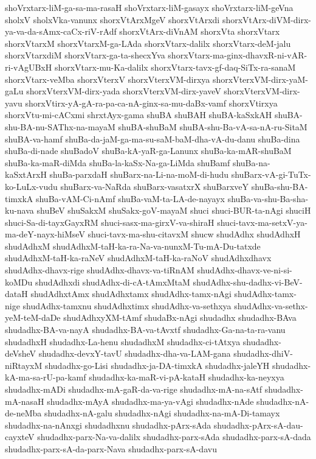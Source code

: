 {shoVrxtarx-liM-ga-sa-ma-rasaH
shoVrxtarx-liM-gasayx
shoVrxtarx-liM-geVna
sholxV
sholxVka-vanunx
shorxVtArxMgeV
shorxVtArxdi
shorxVtArx-diVM-dirx-ya-va-da-sAmx-caCx-riV-rAdf
shorxVtArx-diVnAM
shorxVta
shorxVtarx
shorxVtarxM
shorxVtarxM-ga-LAda
shorxVtarx-dalilx
shorxVtarx-deM-jalu
shorxVtarxdiM
shorxVtarx-ga-ta-shecxYva
shorxVtarx-ma-ginx-dhavxR-ni-vAR-ri-vAgUBxH
shorxVtarx-mu-Ka-dalilx
shorxVtarx-tavx-gf-daq-SiTx-ra-sanaM
shorxVtarx-veMba
shorxVterxV
shorxVterxVM-dirxya
shorxVterxVM-dirx-yaM-gaLu
shorxVterxVM-dirx-yada
shorxVterxVM-dirx-yaveV
shorxVterxVM-dirx-yavu
shorxVtirx-yA-gA-ra-pa-ca-nA-ginx-sa-mu-daBx-vamf
shorxVtirxya
shorxVtu-mi-cACxmi
shrxtAyx-gama
shuBA
shuBAH
shuBA-kaSxkAH
shuBA-shu-BA-nu-SAThx-na-mayaM
shuBA-shuBaM
shuBA-shu-Ba-vA-sa-nA-ru-SitaM
shuBA-va-hamf
shuBa-da-jaM-ga-ma-su-saM-baM-dha-vA-du-danu
shuBa-dina
shuBa-di-nade
shuBadoV
shuBa-kA-yaR-ga-Lanunx
shuBa-ka-mAR-shuBaM
shuBa-ka-maR-diMda
shuBa-la-kaSx-Na-ga-LiMda
shuBamf
shuBa-na-kaSxtArxH
shuBa-parxdaH
shuBarx-na-Li-na-moM-di-hudu
shuBarx-vA-gi-TuTx-ko-LuLx-vudu
shuBarx-va-NaRda
shuBarx-vasatxrX
shuBarxveY
shuBa-shu-BA-timxkA
shuBa-vAM-Ci-nAmf
shuBa-vaM-ta-LA-de-nayayx
shuBa-va-shu-Ba-sha-ku-nava
shuBeV
shuSakxM
shuSakx-goV-mayaM
shuci
shuci-BUR-ta-nAgi
shuciH
shuci-Sa-di-tayxGayxRM
shuci-sasx-ma-girxV-va-shiraH
shuci-tavx-ma-setxV-ya-ma-deY-nayx-hiMseV
shuci-tavx-ma-shu-citavxM
shucw
shudAdhx
shudAdhxH
shudAdhxM
shudAdhxM-taH-ka-ra-Na-va-nunxM-Tu-mA-Du-tatxde
shudAdhxM-taH-ka-raNeV
shudAdhxM-taH-ka-raNoV
shudAdhxdhavx
shudAdhx-dhavx-rige
shudAdhx-dhavx-va-tiRnAM
shudAdhx-dhavx-ve-ni-si-koMDu
shudAdhxdi
shudAdhx-di-cA-tAmxMtaM
shudAdhx-shu-dadhx-vi-BeV-dataH
shudAdhxtAmx
shudAdhxtamx
shudAdhx-tamx-nAgi
shudAdhx-tamx-nige
shudAdhx-tamxnu
shudAdhxtimx
shudAdhx-va-sethxya
shudAdhx-va-sethx-yeM-teM-daDe
shudAdhxyXM-tAmf
shudaBx-nAgi
shudadhx
shudadhx-BAva
shudadhx-BA-va-nayA
shudadhx-BA-va-tAvxtf
shudadhx-Ga-na-ta-ra-vanu
shudadhxH
shudadhx-La-henu
shudadhxM
shudadhx-ci-tAtxya
shudadhx-deVsheV
shudadhx-devxY-tavU
shudadhx-dha-va-LAM-gana
shudadhx-dhiV-niRtayxM
shudadhx-go-Lisi
shudadhx-ja-DA-timxkA
shudadhx-jaleYH
shudadhx-kA-ma-sa-rU-pa-kamf
shudadhx-ka-maR-vi-pA-kataH
shudadhx-ka-neyxya
shudadhx-mADi
shudadhx-mA-gaR-da-va-rige
shudadhx-mA-na-sAtf
shudadhx-mA-nasaH
shudadhx-mAyA
shudadhx-ma-ya-vAgi
shudadhx-nAde
shudadhx-nA-de-neMba
shudadhx-nA-galu
shudadhx-nAgi
shudadhx-na-mA-Di-tamayx
shudadhx-na-nAnxgi
shudadhxnu
shudadhx-pArx-sAda
shudadhx-pArx-sA-dau-cayxteV
shudadhx-parx-Na-va-dalilx
shudadhx-parx-sAda
shudadhx-parx-sA-dada
shudadhx-parx-sA-da-parx-Nava
shudadhx-parx-sA-davu
}

